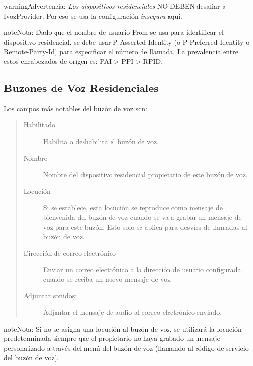 \documentclass[letterpaper,10pt,spanish]{sphinxmanual}
\begin{document}
\begin{notice}{warning}{Advertencia:}
\emph{Los dispositivos residenciales} NO DEBEN desafiar a IvozProvider. Por eso se usa la configuración \emph{insegura} aquí.
\end{notice}

\begin{notice}{note}{Nota:}
Dado que el nombre de usuario From se usa para identificar el dispositivo residencial, se debe usar P-Asserted-Identity (o P-Preferred-Identity o Remote-Party-Id) para especificar el número de llamada. La prevalencia entre estos encabezados de origen es: PAI \textgreater{} PPI \textgreater{} RPID.
\end{notice}


\subsection{Buzones de Voz Residenciales}
\label{administration_portal/client/residential/residential_voicemails:residential-voicemails}\label{administration_portal/client/residential/residential_voicemails::doc}\label{administration_portal/client/residential/residential_voicemails:id1}
Los campos más notables del buzón de voz son:
\begin{quote}
\begin{description}
\item[{Habilitado}] \leavevmode
Habilita o deshabilita el buzón de voz.

\item[{Nombre}] \leavevmode
Nombre del dispositivo residencial propietario de este buzón de voz.

\item[{Locución}] \leavevmode
Si se establece, esta locución se reproduce como mensaje de bienvenida del buzón de voz cuando se va a grabar un mensaje de voz para este buzón. Esto solo se aplica para desvíos de llamadas al buzón de voz.

\item[{Dirección de correo electrónico}] \leavevmode
Enviar un correo electrónico a la dirección de usuario configurada cuando se reciba un nuevo mensaje de voz.

\item[{Adjuntar sonidos:}] \leavevmode
Adjuntar el mensaje de audio al correo electrónico enviado.

\end{description}
\end{quote}

\begin{notice}{note}{Nota:}
Si no se asigna una locución al buzón de voz, se utilizará la locución predeterminada siempre que el propietario no haya grabado un mensaje personalizado a través del menú del buzón de voz (llamando al código de servicio del buzón de voz).
\end{notice}
\end{document}
